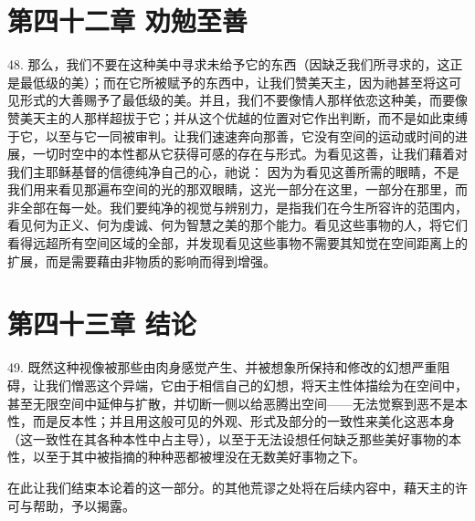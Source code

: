 
\section{第四十二章 劝勉至善}

48. 那么，我们不要在这种美中寻求未给予它的东西（因缺乏我们所寻求的，这正是最低级的美）；而在它所被赋予的东西中，让我们赞美天主，因为祂甚至将这可见形式的大善赐予了最低级的美。并且，我们不要像情人那样依恋这种美，而要像赞美天主的人那样超拔于它；并从这个优越的位置对它作出判断，而不是如此束缚于它，以至与它一同被审判。让我们速速奔向那善，它没有空间的运动或时间的进展，一切时空中的本性都从它获得可感的存在与形式。为看见这善，让我们藉着对我们主耶稣基督的信德纯净自己的心，祂说： 因为为看见这善所需的眼睛，不是我们用来看见那遍布空间的光的那双眼睛，这光一部分在这里，一部分在那里，而非全部在每一处。我们要纯净的视觉与辨别力，是指我们在今生所容许的范围内，看见何为正义、何为虔诚、何为智慧之美的那个能力。看见这些事物的人，将它们看得远超所有空间区域的全部，并发现看见这些事物不需要其知觉在空间距离上的扩展，而是需要藉由非物质的影响而得到增强。\par


\section{第四十三章 结论}

49. 既然这种视像被那些由肉身感觉产生、并被想象所保持和修改的幻想严重阻碍，让我们憎恶这个异端，它由于相信自己的幻想，将天主性体描绘为在空间中，甚至无限空间中延伸与扩散，并切断一侧以给恶腾出空间——无法觉察到恶不是本性，而是反本性；并且用这般可见的外观、形式及部分的一致性来美化这恶本身（这一致性在其各种本性中占主导），以至于无法设想任何缺乏那些美好事物的本性，以至于其中被指摘的种种恶都被埋没在无数美好事物之下。\par

在此让我们结束本论着的这一部分。的其他荒谬之处将在后续内容中，藉天主的许可与帮助，予以揭露。\par

